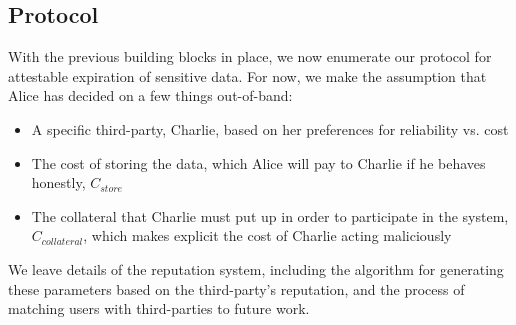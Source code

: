 \documentclass{article}
\begin{document}
\subsection{Protocol}

With the previous building blocks in place, we now enumerate our protocol for attestable expiration of sensitive data. For now, we make the assumption that Alice has decided on a few things out-of-band:

\begin{itemize}
\item A specific third-party, Charlie, based on her preferences for reliability vs. cost
\item The cost of storing the data, which Alice will pay to Charlie if he behaves honestly, $C_{store}$
\item The collateral that Charlie must put up in order to participate in the system, $C_{collateral}$, which makes explicit the cost of Charlie acting maliciously
\end{itemize}

We leave details of the reputation system, including the algorithm for generating these parameters based on the third-party's reputation, and the process of matching users with third-parties to future work.
\end{document}
